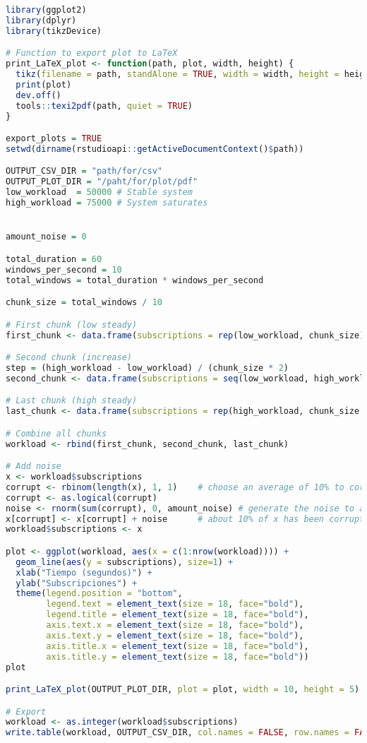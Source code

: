 \begin{lstlisting}[language=R, caption={Programa en R que genera una carga de subscripciones incremental, como en la \autoref{fig:subs_workload-growing}}]
library(ggplot2)
library(dplyr)
library(tikzDevice)

# Function to export plot to LaTeX
print_LaTeX_plot <- function(path, plot, width, height) {
  tikz(filename = path, standAlone = TRUE, width = width, height = height)
  print(plot)
  dev.off()
  tools::texi2pdf(path, quiet = TRUE)
}

export_plots = TRUE
setwd(dirname(rstudioapi::getActiveDocumentContext()$path))

OUTPUT_CSV_DIR = "path/for/csv"
OUTPUT_PLOT_DIR = "/paht/for/plot/pdf"
low_workload  = 50000 # Stable system
high_workload = 75000 # System saturates


amount_noise = 0

total_duration = 60
windows_per_second = 10
total_windows = total_duration * windows_per_second

chunk_size = total_windows / 10

# First chunk (low steady)
first_chunk <- data.frame(subscriptions = rep(low_workload, chunk_size))

# Second chunk (increase)
step = (high_workload - low_workload) / (chunk_size * 2)
second_chunk <- data.frame(subscriptions = seq(low_workload, high_workload, step))

# Last chunk (high steady)
last_chunk <- data.frame(subscriptions = rep(high_workload, chunk_size * 7))

# Combine all chunks
workload <- rbind(first_chunk, second_chunk, last_chunk)

# Add noise
x <- workload$subscriptions
corrupt <- rbinom(length(x), 1, 1)    # choose an average of 10% to corrupt at random
corrupt <- as.logical(corrupt)
noise <- rnorm(sum(corrupt), 0, amount_noise) # generate the noise to add
x[corrupt] <- x[corrupt] + noise      # about 10% of x has been corrupted
workload$subscriptions <- x

plot <- ggplot(workload, aes(x = c(1:nrow(workload)))) +
  geom_line(aes(y = subscriptions), size=1) +
  xlab("Tiempo (segundos)") +
  ylab("Subscripciones") +
  theme(legend.position = "bottom",
        legend.text = element_text(size = 18, face="bold"),
        legend.title = element_text(size = 18, face="bold"),
        axis.text.x = element_text(size = 18, face="bold"),
        axis.text.y = element_text(size = 18, face="bold"),
        axis.title.x = element_text(size = 18, face="bold"),
        axis.title.y = element_text(size = 18, face="bold"))
plot

print_LaTeX_plot(OUTPUT_PLOT_DIR, plot = plot, width = 10, height = 5)

# Export
workload <- as.integer(workload$subscriptions)
write.table(workload, OUTPUT_CSV_DIR, col.names = FALSE, row.names = FALSE, sep = ";")
\end{lstlisting}

